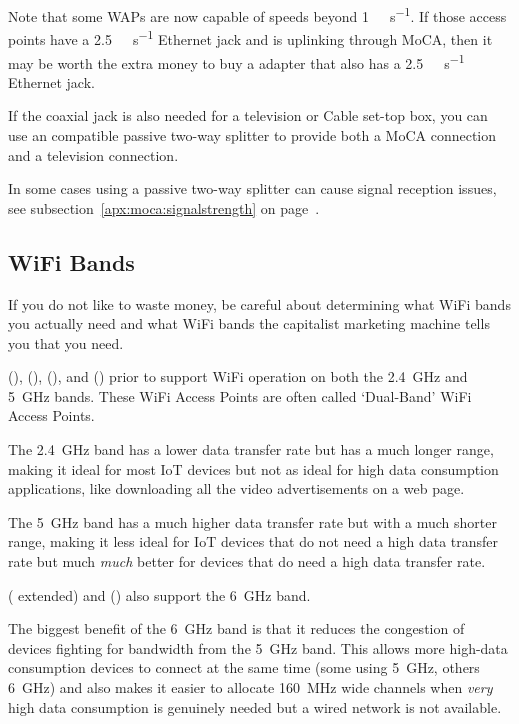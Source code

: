 Note that some WAPs are now capable of speeds beyond \SI{1}{\giga\bit\per\second}. If those access points
have a \SI{2.5}{\giga\bit\per\second} Ethernet jack and is uplinking through MoCA, then it may be worth the
extra money to buy a  adapter that also has a \SI{2.5}{\giga\bit\per\second} Ethernet jack.

If the coaxial jack is also needed for a television or Cable set-top box, you can use an \xdband{} compatible
passive two-way splitter to provide both a MoCA connection and a television connection.

In some cases using a passive two-way splitter can cause signal reception issues, see
subsection~\ref{apx:moca:signalstrength} on page~\pageref{apx:moca:signalstrength}.

\subsection{WiFi Bands}

If you do not like to waste money, be careful about determining what WiFi bands you actually need and what
WiFi bands the capitalist marketing machine tells you that you need.

 (),  (),  (), and  ()
prior to  support WiFi operation on both the \SI{2.4}{\giga\hertz} and \SI{5}{\giga\hertz} bands.
These WiFi Access Points are often called `Dual-Band' WiFi Access Points.

The \SI{2.4}{\giga\hertz} band has a lower data transfer rate but has a much longer range, making it ideal
for most IoT devices but not as ideal for high data consumption applications, like downloading all the
video advertisements on a web page.

The \SI{5}{\giga\hertz} band has a much higher data transfer rate but with a much shorter range, making it
less ideal for IoT devices that do not need a high data transfer rate but much \emph{much} better for
devices that do need a high data transfer rate.

 ( extended) and  () also support the \SI{6}{\giga\hertz} band.

The biggest benefit of the \SI{6}{\giga\hertz} band is that it reduces the congestion of devices fighting
for bandwidth from the \SI{5}{\giga\hertz} band. This allows more high-data consumption devices to connect
at the same time (some using \SI{5}{\giga\hertz}, others \SI{6}{\giga\hertz}) and also makes it easier to
allocate \SI{160}{\mega\hertz} wide channels when \emph{very} high data consumption is genuinely needed
but a wired network is not available.

